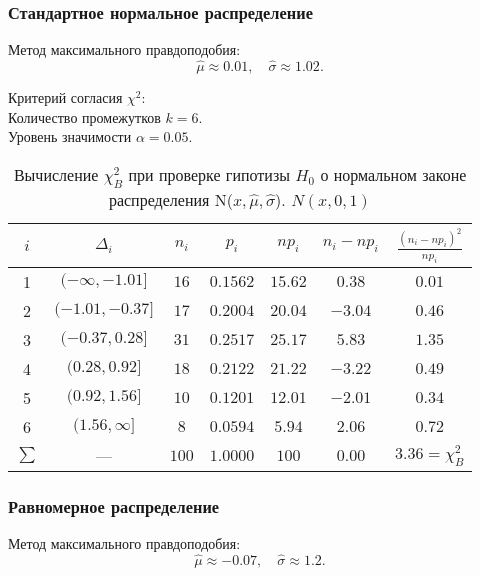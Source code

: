 \documentclass[12pt,a4paper]{article}
\begin{document}
		\subsubsection{Стандартное нормальное распределение}
			Метод максимального правдоподобия:
			$$\hat{\mu} \approx 0.01, \quad \hat{\sigma} \approx 1.02.$$
			
			Критерий согласия $\chi^2$:\\
			Количество промежутков $k = 6$.\\
			Уровень значимости $\alpha = 0.05$.
			\begin{table}[H]
				\begin{center}
					\begin{tabular}{|c|c|c|c|c|c|c|}
						\hline
						$i$ & $\Delta_i$          &   $n_i$ &   $p_i$ &   $np_i$ &   $n_i-np_i$ &   $\frac{(n_i-np_i)^2}{np_i}$ \\
						\hline
						1   & $(-\infty, -1.01]$ & $16$  & $0.1562$ & $15.62$ & $0.38$  & $0.01$ \\
						2   & $(-1.01, -0.37]$   & $17$  & $0.2004$ & $20.04$ & $-3.04$ & $0.46$ \\
						3   & $(-0.37, 0.28]$    & $31$  & $0.2517$ & $25.17$ & $5.83$  & $1.35$ \\
						4   & $(0.28, 0.92]$     & $18$  & $0.2122$ & $21.22$ & $-3.22$ & $0.49$ \\
						5   & $(0.92, 1.56]$     & $10$  & $0.1201$ & $12.01$ & $-2.01$ & $0.34$ \\
						6   & $(1.56, \infty]$   & $8$   & $0.0594$ & $5.94$  & $2.06$  & $0.72$ \\
						$\sum$ & ---                & $100$ & $1.0000$ & $100$   & $0.00$  & $3.36 = \chi^2_B$ \\
						\hline
					\end{tabular}
				\end{center}
				\caption{Вычисление $\chi^2_B$ при проверке гипотизы $H_0$ о нормальном законе распределения N($x, \hat{\mu}, \hat{\sigma}$). $N(x, 0, 1)$}
			\end{table}
	
	
		\subsubsection{Равномерное распределение}
			Метод максимального правдоподобия:
			$$\hat{\mu} \approx -0.07, \quad \hat{\sigma} \approx 1.2.$$
			
\end{document}

